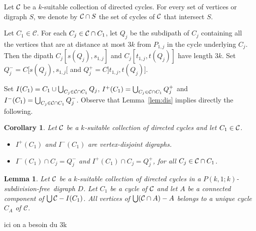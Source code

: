 \documentclass[utf8,10pt]{article}
\theoremstyle{plain}
\newtheorem{lemma}[theorem]{Lemma}
\newtheorem{corollary}[theorem]{Corollary}
\theoremstyle{definition}
\theoremstyle{remark}
\newcommand{\FH}[1]{{\color{red}{\bf Fred:} #1}}
\newcommand{\free}{subdivision-free}
\begin{document}
 
 
 
 
 

Let ${\cal C}$ be a $k$-suitable collection of directed cycles.
For every set of vertices or digraph $S$, we denote by ${\cal C}\cap S$ the set of cycles of ${\cal C}$ that intersect $S$. 



Let $C_1\in \mathcal{C}$.
For each $C_j\in {\cal C} \cap C_1$, let $Q_j$ be the subdipath of $C_j$ 
containing all the vertices that are at distance at most $3k$ from $P_{1,j}$ in the cycle underlying $C_j$.
Then the dipath $C_j[s(Q_j), s_{1,j}]$ and  $C_j[t_{1,j},t (Q_j)]$ have length $3k$.
Set $Q^-_j=C[s(Q_j), s_{1,j}[$ and $Q^+_j=C]t_{1,j}, t(Q_j)]$.


Set  $I(C_1) =C_1\cup \bigcup_{C_j\in {\cal C}\cap C_1} Q_j$, $I^+(C_1) = \bigcup_{C_j\in {\cal C}\cap C_1} Q^+_j$ and $I^-(C_1) = \bigcup_{C_j\in {\cal C}\cap C_1} Q^-_j$.
Observe that Lemma~\ref{lem:dis} implies directly the following.
\begin{corollary}\label{cor:util}
Let ${\cal C}$ be a $k$-suitable collection of directed cycles and let $C_1\in {\cal C}$.
\begin{itemize}
\item[(i)]  $I^+(C_1)$ and $I^-(C_1)$ are vertex-disjoint digraphs. 
\item[(ii)] $I^-(C_1) \cap C_j = Q^-_j$ and $I^+(C_1) \cap C_j = Q^+_j$, for all $C_j\in {\cal C}\cap C_1$.
\end{itemize}
 \end{corollary}



\begin{lemma}\label{lem:A}
Let ${\cal C}$ be a $k$-suitable collection of directed cycles in a $P(k,1;k)$-\free\ digraph $D$.
Let $C_1$ be a cycle of ${\cal C}$ and let $A$ be a connected component of $\bigcup{\cal C} - I(C_1)$.
All vertices of $\bigcup({\cal C}\cap A)  - A$ belongs to a unique cycle $C_A$ of $\mathcal{C}$.
\end{lemma}

\FH{ici on a  besoin du 3k}
\end{document}

